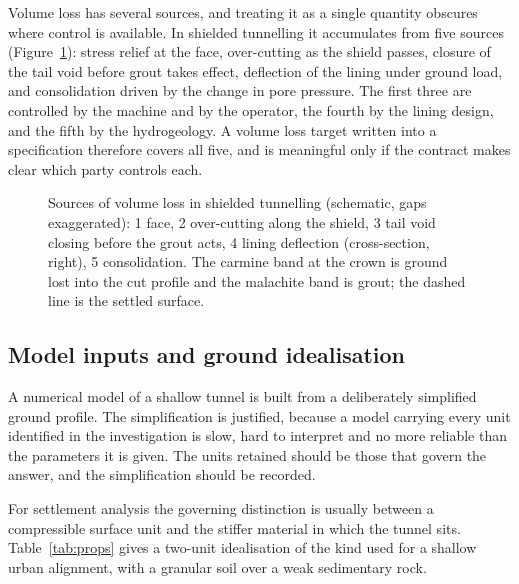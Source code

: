 Volume loss has several sources, and treating it as a single quantity obscures
where control is available. In shielded tunnelling it accumulates from five
sources~\citep{mair1996settlement} (Figure~\ref{fig:volume-loss-sources}): stress relief at the face, over-cutting as
the shield passes, closure of the tail void before grout takes effect,
deflection of the lining under ground load, and consolidation driven by the
change in pore pressure. The first three are controlled by the machine and by
the operator, the fourth by the lining design, and the fifth by the
hydrogeology. A volume loss target written into a specification therefore
covers all five, and is meaningful only if the contract makes clear
which party controls each.

\begin{figure}[htbp]
\centering
{}
\caption{Sources of volume loss in shielded tunnelling (schematic, gaps exaggerated): 1 face, 2 over-cutting along the shield, 3 tail void closing before the grout acts, 4 lining deflection (cross-section, right), 5 consolidation. The carmine band at the crown is ground lost into the cut profile and the malachite band is grout; the dashed line is the settled surface.}
\label{fig:volume-loss-sources}
\end{figure}

\subsection{Model inputs and ground idealisation}
\label{sec:model-inputs-and-geological-idealisation}

A numerical model of a shallow tunnel is built from a deliberately simplified
ground profile. The simplification is justified, because a
model carrying every unit identified in the investigation is slow, hard to
interpret and no more reliable than the parameters it is given. The units
retained should be those that govern the answer, and the
simplification should be recorded.

For settlement analysis the governing distinction is usually between a
compressible surface unit and the stiffer material in which the tunnel sits.
Table~\ref{tab:props} gives a two-unit idealisation of the kind used for a
shallow urban alignment, with a granular soil over a weak sedimentary rock.


